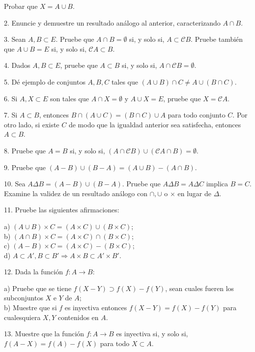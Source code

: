 Probar que \(X = A \cup B\).

2. Enuncie y demuestre un resultado análogo al anterior, caracterizando \( A \cap B \).

3. Sean \( A, B \subset E \). Pruebe que \( A \cap B = \emptyset \) si, y solo si, \( A \subset \mathcal{C}B \). Pruebe también que \( A \cup B = E \) si, y solo si, \( \mathcal{C}A \subset B \).

4. Dados \( A, B \subset E \), pruebe que \( A \subset B \) si, y solo si, \( A \cap \mathcal{C}B = \emptyset \).

5. Dé ejemplo de conjuntos \( A, B, C \) tales que \( (A \cup B) \cap C \neq A \cup (B \cap C) \).

6. Si \( A, X \subset E \) son tales que \( A \cap X = \emptyset \) y \( A \cup X = E \), pruebe que \( X = \mathcal{C}A \).

7. Si \( A \subset B \), entonces \( B \cap (A \cup C) = (B \cap C) \cup A \) para todo conjunto \( C \). Por otro lado, si existe \( C \) de modo que la igualdad anterior sea satisfecha, entonces \( A \subset B \).

8. Pruebe que \( A = B \) si, y solo si, \( (A \cap \mathcal{C}B) \cup (\mathcal{C}A \cap B) = \emptyset \).

9. Pruebe que \( (A - B) \cup (B - A) = (A \cup B) - (A \cap B) \).

10. Sea \( A \Delta B = (A - B) \cup (B - A) \). Pruebe que \( A \Delta B = A \Delta C \) implica \( B = C \). Examine la validez de un resultado análogo con \( \cap, \cup \) o \( \times \) en lugar de \( \Delta \).

11. Pruebe las siguientes afirmaciones:

a) \( (A \cup B) \times C = (A \times C) \cup (B \times C) \);\\
b) \( (A \cap B) \times C = (A \times C) \cap (B \times C) \);\\
c) \( (A - B) \times C = (A \times C) - (B \times C) \);\\
d) \( A \subset A', B \subset B' \Rightarrow A \times B \subset A' \times B' \).

12. Dada la función \( f: A \to B \):

a) Pruebe que se tiene \( f(X - Y) \supset f(X) - f(Y) \), sean cuales fueren los subconjuntos \( X \) e \( Y \) de \( A \);\\
b) Muestre que si \(f\) es inyectiva entonces \(f(X - Y) = f(X) - f(Y)\) para cualesquiera \(X, Y\) contenidos en \(A\).

13. Muestre que la función \(f: A \to B\) es inyectiva si, y solo si, \(f(A - X) = f(A) - f(X)\) para todo \(X \subset A\).

